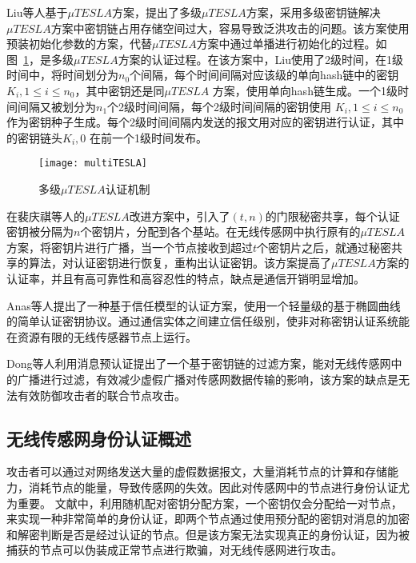 Liu等人基于$\mu TESLA$方案，提出了多级$\mu TESLA$方案，采用多级密钥链解决$\mu TESLA$方案中密钥链占用存储空间过大，容易导致泛洪攻击的问题。该方案使用预装初始化参数的方案，代替$\mu TESLA$方案中通过单播进行初始化的过程。如图~\ref{fig:MultiTESLA}，是多级$\mu TESLA$方案的认证过程。在该方案中，Liu使用了2级时间，在1级时间中，将时间划分为$n_0$个间隔，每个时间间隔对应该级的单向hash链中的密钥$K_i,1\leq i \leq n_0$，其中密钥还是同$\mu TESLA$ 方案，使用单向hash链生成。一个1级时间间隔又被划分为$n_1$个2级时间间隔，每个2级时间间隔的密钥使用
$K_i,1\leq i \leq n_0$作为密钥种子生成。每个2级时间间隔内发送的报文用对应的密钥进行认证，其中的密钥链头$K_i,0$ 在前一个1级时间发布。
\begin{figure}[htbp]
  \centering
  \texttt{[image: multiTESLA]}
  \caption{多级$\mu TESLA$认证机制}
  \label{fig:MultiTESLA}
\end{figure}

在裴庆祺等人的$\mu TESLA$改进方案中，引入了$(t,n)$的门限秘密共享，每个认证密钥被分隔为$n$个密钥片，分配到各个基站。在无线传感网中执行原有的$\mu TESLA$方案，将密钥片进行广播，当一个节点接收到超过$t$个密钥片之后，就通过秘密共享的算法，对认证密钥进行恢复，重构出认证密钥。该方案提高了$\mu TESLA$方案的认证率，并且有高可靠性和高容忍性的特点，缺点是通信开销明显增加。

Anas等人提出了一种基于信任模型的认证方案，使用一个轻量级的基于椭圆曲线的简单认证密钥协议。通过通信实体之间建立信任级别，使非对称密钥认证系统能在资源有限的无线传感器节点上运行。

Dong等人利用消息预认证提出了一个基于密钥链的过滤方案，能对无线传感网中的广播进行过滤，有效减少虚假广播对传感网数据传输的影响，该方案的缺点是无法有效防御攻击者的联合节点攻击。




\subsection{无线传感网身份认证概述}

攻击者可以通过对网络发送大量的虚假数据报文，大量消耗节点的计算和存储能力，消耗节点的能量，导致传感网的失效。因此对传感网中的节点进行身份认证尤为重要。
文献\cite{c2:chan2003random}中，利用随机配对密钥分配方案，一个密钥仅会分配给一对节点，来实现一种非常简单的身份认证，即两个节点通过使用预分配的密钥对消息的加密和解密判断是否是经过认证的节点。但是该方案无法实现真正的身份认证，因为被捕获的节点可以伪装成正常节点进行欺骗，对无线传感网进行攻击。

